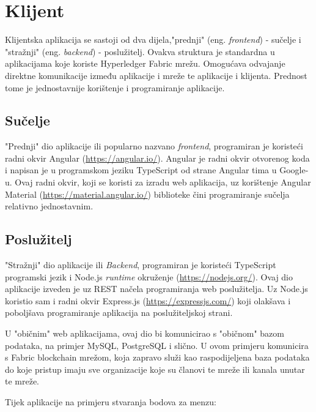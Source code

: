 \documentclass[times, utf8, diplomski]{fer}
\begin{document}
\section{Klijent}

Klijentska aplikacija se sastoji od dva dijela,"prednji" (eng. \textit{frontend}) - sučelje i "stražnji" (eng. \textit{backend}) - poslužitelj. Ovakva struktura je standardna u aplikacijama koje koriste Hyperledger Fabric mrežu.  Omogućava odvajanje direktne komunikacije između aplikacije i mreže te aplikacije i klijenta. Prednost tome je jednostavnije korištenje i programiranje aplikacije. 

\subsection{Sučelje}

"Prednji" dio aplikacije ili popularno nazvano \textit{frontend},  programiran je koristeći radni okvir Angular (\url{https://angular.io/}).  Angular je radni okvir otvorenog koda i napisan je u programskom jeziku TypeScript od strane Angular tima u Google-u. Ovaj radni okvir,  koji se koristi za izradu web aplikacija, uz korištenje Angular Material (\url{https://material.angular.io/}) biblioteke čini programiranje sučelja relativno jednostavnim. 

\subsection{Poslužitelj}

"Stražnji" dio aplikacije ili \textit{Backend}, programiran je koristeći TypeScript programski jezik i Node.js \textit{runtime} okruženje (\url{https://nodejs.org/}).  Ovaj dio aplikacije izveden je uz REST načela \cite{BATTLE200861} programiranja web poslužitelja. Uz Node.js koristio sam i radni okvir Express.js (\url{https://expressjs.com/}) koji olakšava i poboljšava programiranje aplikacija na poslužiteljskoj strani.

U "običnim" web aplikacijama, ovaj dio bi komunicirao s "običnom" bazom podataka, na primjer MySQL, PostgreSQL i slično. U ovom primjeru komunicira s Fabric blockchain mrežom, koja zapravo služi kao raspodijeljena baza podataka do koje pristup imaju sve organizacije koje su članovi te mreže ili kanala unutar te mreže. 

Tijek aplikacije na primjeru stvaranja bodova za menzu:
\end{document}
